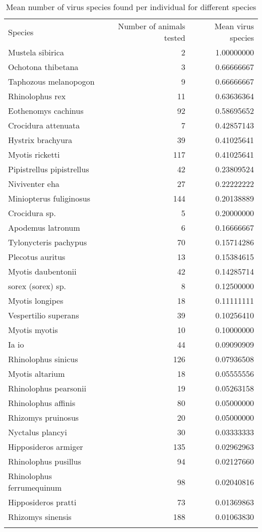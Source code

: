 \documentclass[11pt,article,oneside]{article}
\begin{document}
\begin{longtable}[c]{@{}lrr@{}}
\toprule\addlinespace
Species & Number of animals tested & Mean virus species
\\\addlinespace
\midrule\endhead
Mustela sibirica & 2 & 1.00000000
\\\addlinespace
Ochotona thibetana & 3 & 0.66666667
\\\addlinespace
Taphozous melanopogon & 9 & 0.66666667
\\\addlinespace
Rhinolophus rex & 11 & 0.63636364
\\\addlinespace
Eothenomys cachinus & 92 & 0.58695652
\\\addlinespace
Crocidura attenuata & 7 & 0.42857143
\\\addlinespace
Hystrix brachyura & 39 & 0.41025641
\\\addlinespace
Myotis ricketti & 117 & 0.41025641
\\\addlinespace
Pipistrellus pipistrellus & 42 & 0.23809524
\\\addlinespace
Niviventer eha & 27 & 0.22222222
\\\addlinespace
Miniopterus fuliginosus & 144 & 0.20138889
\\\addlinespace
Crocidura sp. & 5 & 0.20000000
\\\addlinespace
Apodemus latronum & 6 & 0.16666667
\\\addlinespace
Tylonycteris pachypus & 70 & 0.15714286
\\\addlinespace
Plecotus auritus & 13 & 0.15384615
\\\addlinespace
Myotis daubentonii & 42 & 0.14285714
\\\addlinespace
sorex (sorex) sp. & 8 & 0.12500000
\\\addlinespace
Myotis longipes & 18 & 0.11111111
\\\addlinespace
Vespertilio superans & 39 & 0.10256410
\\\addlinespace
Myotis myotis & 10 & 0.10000000
\\\addlinespace
Ia io & 44 & 0.09090909
\\\addlinespace
Rhinolophus sinicus & 126 & 0.07936508
\\\addlinespace
Myotis altarium & 18 & 0.05555556
\\\addlinespace
Rhinolophus pearsonii & 19 & 0.05263158
\\\addlinespace
Rhinolophus affinis & 80 & 0.05000000
\\\addlinespace
Rhizomys pruinosus & 20 & 0.05000000
\\\addlinespace
Nyctalus plancyi & 30 & 0.03333333
\\\addlinespace
Hipposideros armiger & 135 & 0.02962963
\\\addlinespace
Rhinolophus pusillus & 94 & 0.02127660
\\\addlinespace
Rhinolophus ferrumequinum & 98 & 0.02040816
\\\addlinespace
Hipposideros pratti & 73 & 0.01369863
\\\addlinespace
Rhizomys sinensis & 188 & 0.01063830
\\\addlinespace
\bottomrule
\addlinespace
\caption{Mean number of virus species found per individual for different
species}
\end{longtable}
\end{document}
